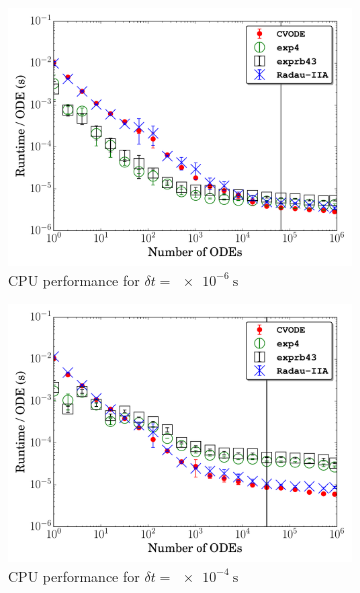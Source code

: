 \documentclass[preprint]{elsarticle}
\begin{document}
\begin{figure}[htb]
  \centering
  \begin{subfigure}{0.49\textwidth}
      \includegraphics[width=\linewidth]{H2_1e-06_cpu.pdf}
      \caption{CPU performance for $\delta t = \SI{e-6}{\second}$}
      \label{F:h2_cpu_perf_small}
  \end{subfigure}
  \begin{subfigure}{0.49\textwidth}
      \includegraphics[width=\linewidth]{H2_1e-04_cpu.pdf}
      \caption{CPU performance for $\delta t = \SI{e-4}{\second}$}
      \label{F:h2_cpu_perf_large}
  \end{subfigure}\\
  \begin{subfigure}{0.49\textwidth}

\end{subfigure}
\end{figure}
\end{document}
